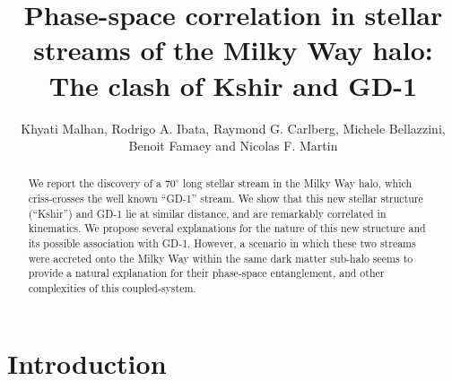 \documentclass[apj]{emulateapj}
\def\deg{^\circ}
\begin{document}
\title{Phase-space correlation in stellar streams of the Milky Way halo:\\ The clash of Kshir and GD-1}


\author{Khyati Malhan, Rodrigo A. Ibata, Raymond G. Carlberg, Michele Bellazzini, Benoit Famaey and Nicolas F. Martin}



\begin{abstract}
We report the discovery of a $70\deg$ long stellar stream in the Milky Way halo, which criss-crosses the well known ``GD-1'' stream.  We show that this new stellar structure (``Kshir'') and GD-1 lie at similar distance, and are remarkably correlated in kinematics. We propose several explanations for the nature of this new structure and its possible association with GD-1. However, a scenario in which these two streams were accreted onto the Milky Way within the same dark matter sub-halo seems to provide a natural explanation for their phase-space entanglement, and other complexities of this coupled-system.
\end{abstract}

\section{Introduction}\label{sec:Introduction}
\end{document}
